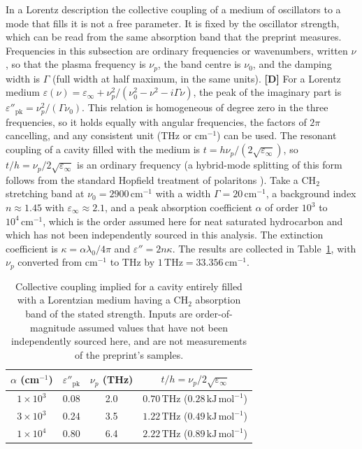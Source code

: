 \documentclass[11pt]{article}
\newcommand{\stD}{\textbf{\textcolor{green!40!black}{[D]}}}
\newcommand{\thz}{\,\mathrm{THz}}
\newcommand{\kjm}{\,\mathrm{kJ\,mol^{-1}}}
\newcommand{\cmi}{\,\mathrm{cm^{-1}}}
\theoremstyle{plain}
\theoremstyle{definition}
\theoremstyle{remark}
\begin{document}
In a Lorentz description the collective coupling of a medium of oscillators to a mode that fills it is not a free parameter. It is fixed by the oscillator strength, which can be read from the same absorption band that the preprint measures. Frequencies in this subsection are ordinary frequencies or wavenumbers, written $\nu$, so that the plasma frequency is $\nu_p$, the band centre is $\nu_0$, and the damping width is $\Gamma$ (full width at half maximum, in the same units). \stD{} For a Lorentz medium $\varepsilon(\nu)=\varepsilon_\infty+\nu_p^2/(\nu_0^2-\nu^2-i\Gamma\nu)$, the peak of the imaginary part is $\varepsilon''_{\mathrm{pk}}=\nu_p^2/(\Gamma\nu_0)$. This relation is homogeneous of degree zero in the three frequencies, so it holds equally with angular frequencies, the factors of $2\pi$ cancelling, and any consistent unit (THz or $\mathrm{cm^{-1}}$) can be used. The resonant coupling of a cavity filled with the medium is $t=h\nu_p/(2\sqrt{\varepsilon_\infty})$, so $t/h=\nu_p/2\sqrt{\varepsilon_\infty}$ is an ordinary frequency (a hybrid-mode splitting of this form follows from the standard Hopfield treatment of polaritons \cite{hopfield1958}). Take a CH$_2$ stretching band at $\nu_0=2900\cmi$ with a width $\Gamma=20\cmi$, a background index $n\approx1.45$ with $\varepsilon_\infty\approx2.1$, and a peak absorption coefficient $\alpha$ of order $10^3$ to $10^4\cmi$, which is the order assumed here for neat saturated hydrocarbon and which has not been independently sourced in this analysis. The extinction coefficient is $\kappa=\alpha\lambda_0/4\pi$ and $\varepsilon''=2n\kappa$. The results are collected in Table~\ref{tab:bound}, with $\nu_p$ converted from $\mathrm{cm^{-1}}$ to THz by $1\thz=33.356\cmi$.

\begin{table}[ht]
\centering
\small
\begin{tabular}{@{}cccc@{}}
\toprule
$\alpha$ (cm$^{-1}$) & $\varepsilon''_{\mathrm{pk}}$ & $\nu_p$ (THz) & $t/h=\nu_p/2\sqrt{\varepsilon_\infty}$ \\
\midrule
$1\times10^{3}$ & 0.08 & 2.0 & $0.70\thz$ ($0.28\kjm$) \\
$3\times10^{3}$ & 0.24 & 3.5 & $1.22\thz$ ($0.49\kjm$) \\
$1\times10^{4}$ & 0.80 & 6.4 & $2.22\thz$ ($0.89\kjm$) \\
\bottomrule
\end{tabular}
\caption{Collective coupling implied for a cavity entirely filled with a Lorentzian medium having a CH$_2$ absorption band of the stated strength. Inputs are order-of-magnitude assumed values that have not been independently sourced here, and are not measurements of the preprint's samples.}
\label{tab:bound}
\end{table}
\end{document}
